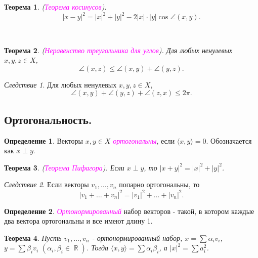 \documentclass[a4paper,100pt]{article}
\theoremstyle{indented}
\newtheorem{theorem}{Теорема}
\theoremstyle{definition}
\newtheorem{defn}{Определение}
\theoremstyle{remark}
\newtheorem{cons}{Следствие}
\DeclareMathOperator{\RR}{\mathbb{R}}
\begin{document}
\begin{theorem}
    (\textit{\textcolor{magenta}{\hypertarget{s59}{Теорема косинусов}}}). 
    \[
        |x-y|^2 = |x|^2+|y|^2-2|x|\cdot |y| \cos \angle (x, y).
    \]
\end{theorem} \ 

\begin{theorem}
    (\textit{\textcolor{magenta}{\hypertarget{s60}{Неравенство треугольника для углов}}}). Для любых ненулевых $x, y, z\in X$, 
    \[
        \angle(x, z)\leq \angle (x, y)+ \angle (y, z). 
    \]
\end{theorem}

\begin{cons}
    Для любых ненулевых $x, y, z\in X$, 
    \[
        \angle(x, y)+\angle(y, z)+\angle(z, x)\leq 2\pi. 
    \]
\end{cons}

\subsection{Ортогональность.}

\begin{defn}
    Векторы $x, y\in X$ \textit{\textcolor{magenta}{\hypertarget{s61}{ортогональны}}}, если $\langle x, y \rangle = 0$. Обозначается как $x\perp y$. 
\end{defn}

\begin{theorem}
    (\textit{\textcolor{magenta}{\hypertarget{s62}{Теорема Пифагора}}}). Если $x \perp y$, то $|x+y|^2=|x|^2+|y|^2$. 
\end{theorem}

\begin{cons}
    Если векторы $v_1, \ldots, v_n$ попарно ортогональны, то 
    \[
        |v_1+\ldots+v_n|^2=|v_1|^2+\ldots+|v_n|^2. 
    \]
\end{cons}

\begin{defn}
    \textit{\textcolor{magenta}{\hypertarget{s63}{Ортонормированный}}} набор векторов - такой, в котором каждые два вектора ортогональны и все имеют длину 1.
\end{defn}

\begin{theorem}
    Пусть $v_1, \ldots, v_n$ - ортонормированный набор, $x=\sum \alpha_i v_i$, $y=\sum \beta_i v_i$ $(\alpha_i, \beta_i \in \RR)$. Тогда $\langle x, y \rangle = \sum \alpha_i \beta_i$, а $|x|^2=\sum a_i^2$. 
\end{theorem} \
\end{document}
